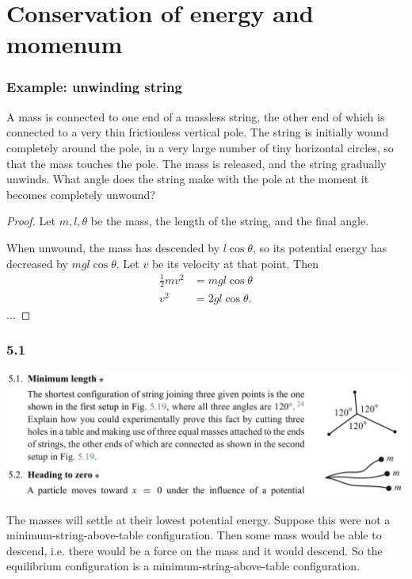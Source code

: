 \section{Conservation of energy and momenum}


\subsubsection{Example: unwinding string}
A mass is connected to one end of a massless string, the other end of which is connected to a very
thin frictionless vertical pole. The string is initially wound completely around the pole, in a very
large number of tiny horizontal circles, so that the mass touches the pole. The mass is released,
and the string gradually unwinds. What angle does the string make with the pole at the moment it
becomes completely unwound?

\begin{proof}
  Let $m, l, \theta$ be the mass, the length of the string, and the final angle.

  When unwound, the mass has descended by $l\cos\theta$, so its potential energy has decreased by
  $mgl\cos\theta$. Let $v$ be its velocity at that point. Then
  \begin{align*}
    \frac{1}{2}mv^2 &= mgl\cos\theta\\
    v^2             &= 2gl\cos\theta.
  \end{align*}
  ...
\end{proof}

\subsubsection*{5.1}
\begin{mdframed}
  \includegraphics[width=400pt]{img/physics--classical-mechanics--morin--5-1.png}
\end{mdframed}

The masses will settle at their lowest potential energy. Suppose this were not a
minimum-string-above-table configuration. Then some mass would be able to descend, i.e. there would
be a force on the mass and it would descend. So the equilibrium configuration is a
minimum-string-above-table configuration.

